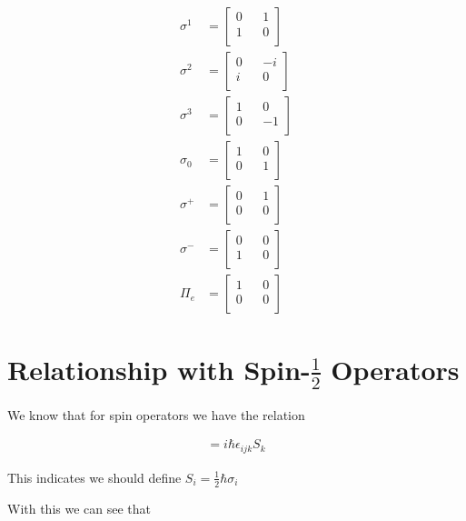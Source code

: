 \documentclass[12pt]{article}
\begin{document}
\begin{align}
\sigma^1 &= 
\begin{bmatrix}
0 && 1\\
1 && 0\\
\end{bmatrix}\\
\sigma^2 &= 
\begin{bmatrix}
0 && -i\\
i && 0\\
\end{bmatrix}\\
\sigma^3 &= 
\begin{bmatrix}
1 && 0\\
0 && -1\\
\end{bmatrix}\\
\sigma_0 &= 
\begin{bmatrix}
1 && 0\\
0 && 1\\
\end{bmatrix}\\
\sigma^+ &= 
\begin{bmatrix}
0 && 1\\
0 && 0\\
\end{bmatrix}\\
\sigma^- &= 
\begin{bmatrix}
0 && 0\\
1 && 0\\
\end{bmatrix}\\
\Pi_e &=
\begin{bmatrix}
1 && 0\\
0 && 0\\
\end{bmatrix}
\end{align}

\section{Relationship with Spin-$\frac{1}{2}$ Operators}

We know that for spin operators we have the relation

\begin{align}
[S_i, S_j] = i\hbar\epsilon_{ijk}S_k
\end{align}

This indicates we should define $S_i = \frac{1}{2}\hbar \sigma_i$

With this we can see that
\end{document}
